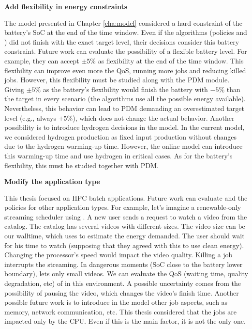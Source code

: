 \textbf{Add flexibility in energy constraints}

The model presented in Chapter \ref{cha:model} considered a hard constraint of the battery's SoC at the end of the time window. Even if the algorithms (policies and \emph{\systemName}) did not finish with the exact target level, their decisions consider this battery constraint. Future work can evaluate the possibility of a flexible battery level. For example, they can accept $\pm 5\%$ as flexibility at the end of the time window. This flexibility can improve even more the QoS, running more jobs and reducing killed jobs. However, this flexibility must be studied along with the PDM module. Giving $\pm 5\%$ as the battery's flexibility would finish the battery with $-5\%$ than the target in every scenario (the algorithms use all the possible energy available). Nevertheless, this behavior can lead to PDM demanding an overestimated target level (e.g., always $+5\%$), which does not change the actual behavior. Another possibility is to introduce hydrogen decisions in the model. In the current model, we considered hydrogen production as fixed input production without changes due to the hydrogen warming-up time. However, the online model can introduce this warming-up time and use hydrogen in critical cases. As for the battery's flexibility, this must be studied together with PDM.

\textbf{Modify the application type}

This thesis focused on HPC batch applications. Future work can evaluate \emph{\systemName} and the policies for other application types. For example, let's imagine a renewable-only streaming scheduler using \emph{\systemName}. A new user sends a request to watch a video from the catalog. The catalog has several videos with different sizes. The video size can be our walltime, which \emph{\systemName} uses to estimate the energy demanded. The user should wait for his time to watch (supposing that they agreed with this to use clean energy). Changing the processor's speed would impact the video quality. Killing a job interrupts the streaming. In dangerous moments (SoC close to the battery lower boundary), \emph{\systemName} lets only small videos. We can evaluate the QoS (waiting time, quality degradation, etc) of \emph{\systemName} in this environment. A possible uncertainty comes from the possibility of pausing the video, which changes the video's finish time. Another possible future work is to introduce in the model other job aspects, such as memory, network communication, etc. This thesis considered that the jobs are impacted only by the CPU. Even if this is the main factor, it is not the only one.

